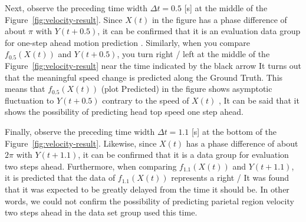 \documentclass{sigchi}
\begin{document}
Next, observe the preceding time width $ \Delta t = 0.5 $ [s] at the middle of the Figure~\ref{fig:velocity-result}. Since $ X (t) $ in the figure has a phase difference of about $ \pi $ with $ Y (t + 0.5) $, it can be confirmed that it is an evaluation data group for one-step ahead motion prediction . Similarly, when you compare $ f_ {0.5} (X (t)) $ and $ Y (t + 0.5) $, you turn right / left at the middle of the Figure~\ref{fig:velocity-result} near the time indicated by the black arrow It turns out that the meaningful speed change is predicted along the Ground Truth. This means that $ f_ {0.5} (X (t)) $ (plot Predicted) in the figure shows asymptotic fluctuation to $ Y (t + 0.5) $ contrary to the speed of $ X (t) $ , It can be said that it shows the possibility of predicting head top speed one step ahead.

Finally, observe the preceding time width $ \Delta t = 1.1 $ [s] at the bottom of the Figure~\ref{fig:velocity-result}. Likewise, since $ X (t) $ has a phase difference of about $ 2 \pi $ with $ Y (t + 1.1) $, it can be confirmed that it is a data group for evaluation two steps ahead. Furthermore, when comparing $ f_ {1.1} (X (t)) $ and $ Y (t + 1.1) $, it is predicted that the data of $ f_ {1.1} (X (t)) $ represents a right / It was found that it was expected to be greatly delayed from the time it should be. In other words, we could not confirm the possibility of predicting parietal region velocity two steps ahead in the data set group used this time.


\end{document}
